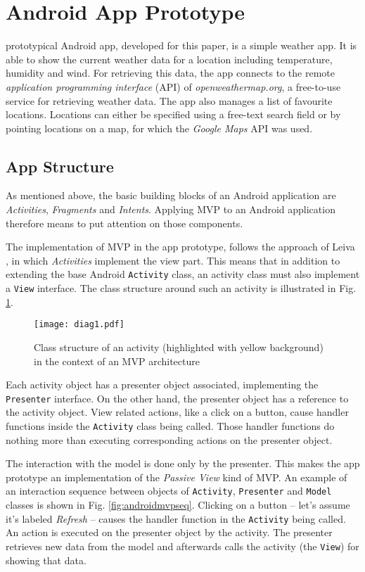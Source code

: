 
\section{Android App Prototype}

 prototypical Android app, developed for this paper, is a simple weather app. It is able to show the current weather data for a location including temperature, humidity and wind. For retrieving this data, the app connects to the remote \emph{application programming interface} (API) of \emph{openweathermap.org}, a free-to-use service for retrieving weather data. The app also manages a list of favourite locations. Locations can either be specified using a free-text search field or by pointing locations on a map, for which the \emph{Google Maps} API was used.

\subsection{App Structure}

As mentioned above, the basic building blocks of an Android application are \emph{Activities}, \emph{Fragments} and \emph{Intents}. Applying MVP to an Android application therefore means to put attention on those components.

The implementation of MVP in the app prototype, follows the approach of Leiva \cite{AntLeiv14}, in which \emph{Activities} implement the view part. This means that in addition to extending the base Android \texttt{Activity} class, an activity class must also implement a \texttt{View} interface. The class structure around such an activity is illustrated in Fig. \ref{fig:androidmvp}.

\begin{figure}[h]
\centering
\texttt{[image: diag1.pdf]}
\caption{Class structure of an activity (highlighted with yellow background) in the context of an MVP architecture}
\label{fig:androidmvp}
\end{figure}

Each activity object has a presenter object associated, implementing the \texttt{Presenter} interface. On the other hand, the presenter object has a reference to the activity object. View related actions, like a click on a button, cause handler functions inside the \texttt{Activity} class being called. Those handler functions do nothing more than executing corresponding actions on the presenter object.

The interaction with the model is done only by the presenter. This makes the app prototype an implementation of the \emph{Passive View} kind of MVP.
An example of an interaction sequence between objects of \texttt{Activity}, \texttt{Presenter} and \texttt{Model} classes is shown in Fig. \ref{fig:androidmvpseq}. Clicking on a button -- let's assume it's labeled \emph{Refresh} -- causes the handler function in the \texttt{Activity} being called. An action is executed on the presenter object by the activity. The presenter retrieves new data from the model and afterwards calls the activity (the \texttt{View}) for showing that data.

